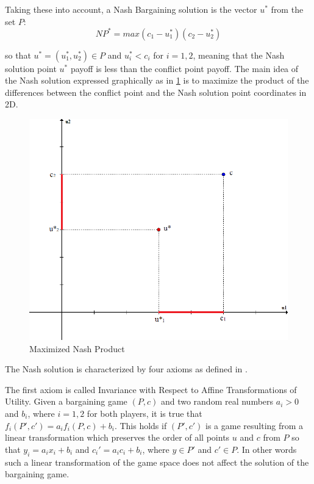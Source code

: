 Taking these into account, a Nash Bargaining solution is the vector $u^*$ from the set $P$:
\begin{equation}
NP^* = max(c_1 - u_1^* )(c_2 - u_2^*)
\end{equation}

so that $u^* = (u_1^*,u_2^*) \in P$ and $u_i^* < c_i$ for $i = 1,2$, meaning that the Nash solution point $u^*$ payoff is less than the conflict point payoff. The main idea of the Nash solution expressed graphically as in \ref{fig:nashSol} is to maximize the product of the differences between the conflict point and the Nash solution point coordinates in 2D.

\begin{figure}[h]
\centering
\includegraphics[scale=0.5]{figures/nashSolution}
\caption{Maximized Nash Product}
\label{fig:nashSol}
\end{figure}

The Nash solution is characterized by four axioms as defined in \citet{holler2006einfuhrung}. 

The first axiom is called Invariance with Respect to Affine Transformations of Utility. Given a bargaining game $(P,c)$ and two random real numbers $a_i > 0$ and $b_i$, where $i = 1,2$ for both players, it is true that $f_i(P',c') = a_i f_i(P,c) + b_i$. This holds if $(P',c')$ is a game resulting from a linear transformation which preserves the order of all points $u$ and $c$ from $P$ so that $y_i = a_i x_i + b_i$ and $c_i' = a_i c_i + b_i$, where $y \in P'$ and $c' \in P$. In other words such a linear transformation of the game space does not affect the solution of the bargaining game.

